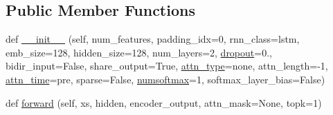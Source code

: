 \subsection*{Public Member Functions}
\begin{DoxyCompactItemize}
\item 
def \hyperlink{classparlai_1_1agents_1_1legacy__agents_1_1seq2seq_1_1modules__v0_1_1Decoder_a96b70aa2702cbca1322750098d236659}{\+\_\+\+\_\+init\+\_\+\+\_\+} (self, num\+\_\+features, padding\+\_\+idx=0, rnn\+\_\+class=\textquotesingle{}lstm\textquotesingle{}, emb\+\_\+size=128, hidden\+\_\+size=128, num\+\_\+layers=2, \hyperlink{classparlai_1_1agents_1_1legacy__agents_1_1seq2seq_1_1modules__v0_1_1Decoder_a30f7fda6849e48ff666c90edffbc9906}{dropout}=0., bidir\+\_\+input=False, share\+\_\+output=True, \hyperlink{classparlai_1_1agents_1_1legacy__agents_1_1seq2seq_1_1modules__v0_1_1Decoder_aac83532f1e9bab04ee87ed3c4e5bcb83}{attn\+\_\+type}=\textquotesingle{}none\textquotesingle{}, attn\+\_\+length=-\/1, \hyperlink{classparlai_1_1agents_1_1legacy__agents_1_1seq2seq_1_1modules__v0_1_1Decoder_acbb937e041f6f172d15d1eda413c7aca}{attn\+\_\+time}=\textquotesingle{}pre\textquotesingle{}, sparse=False, \hyperlink{classparlai_1_1agents_1_1legacy__agents_1_1seq2seq_1_1modules__v0_1_1Decoder_a0a6bc4b07be34760e42add6dfbbf736b}{numsoftmax}=1, softmax\+\_\+layer\+\_\+bias=False)
\item 
def \hyperlink{classparlai_1_1agents_1_1legacy__agents_1_1seq2seq_1_1modules__v0_1_1Decoder_af2cfe1b8b2780f80893db77fa4b75aea}{forward} (self, xs, hidden, encoder\+\_\+output, attn\+\_\+mask=None, topk=1)
\end{DoxyCompactItemize}
